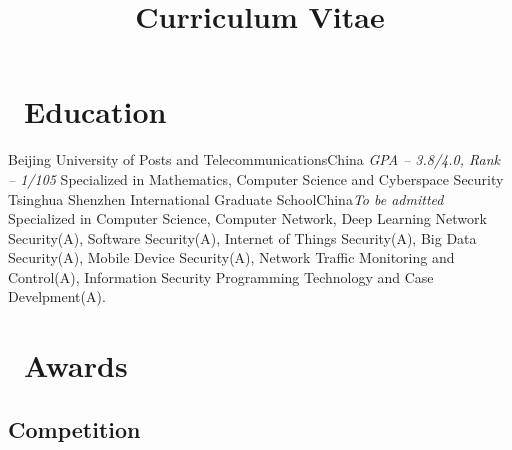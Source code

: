 \documentclass[11pt,a4paper,sans]{moderncv} %
\title{Curriculum Vitae}
\begin{document}

\makecvtitle %

\begin{spacing}{-2.0}
\end{spacing}


\section{\faGraduationCap\  Education}
{Beijing University of Posts and Telecommunications}{China}
{\textit{GPA -- 3.8/4.0, Rank -- 1/105}}
{Specialized in Mathematics, Computer Science and Cyberspace Security}
{Tsinghua Shenzhen International Graduate School}{China}{\textit{To be admitted}}
{Specialized in Computer Science, Computer Network, Deep Learning}
{Network Security(A), Software Security(A), 
Internet of Things Security(A), Big Data Security(A), Mobile Device Security(A),  
Network Traffic Monitoring and Control(A),
Information Security Programming Technology and Case Develpment(A).}


\section{\faTrophy\  Awards}
\subsection{Competition}
\end{document}
